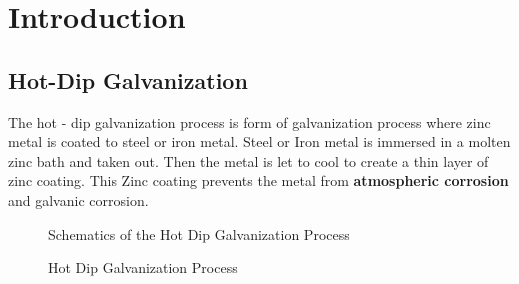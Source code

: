 \documentclass[main.tex]{subfiles}
\begin{document}
\chapter{Introduction}
\section{Hot-Dip Galvanization} 
The hot - dip galvanization process is form of galvanization process where zinc metal is coated to steel or iron metal. Steel or Iron metal is immersed in a molten zinc bath and taken out. Then the metal is let to cool to create a thin layer of zinc coating. This Zinc coating prevents the metal from \textbf{atmospheric corrosion} and galvanic corrosion. 

\begin{figure}[h!]
\centering


\caption{Schematics of the Hot Dip Galvanization Process}
\label{fig:hotdip_sch}
\end{figure}


\begin{figure}[h!]
\centering


\caption{Hot Dip Galvanization Process}
\label{fig:hotdip}
\end{figure}
\end{document}
